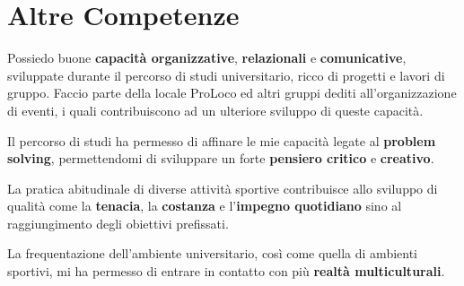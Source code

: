 %
%
%
%
%
%



\section{Altre Competenze}

\cvitem{}
{Possiedo buone \textbf{capacità organizzative}, \textbf{relazionali} e
\textbf{comunicative}, sviluppate durante il percorso di studi universitario,
ricco di progetti e lavori di gruppo. Faccio parte della locale ProLoco ed altri
gruppi dediti all'organizzazione di eventi, i quali contribuiscono ad un
ulteriore sviluppo di queste capacità.}

\cvitem{}
{Il percorso di studi ha permesso di affinare le mie capacità legate al
\textbf{problem solving}, permettendomi di sviluppare un forte \textbf{pensiero
critico} e \textbf{creativo}.}

\cvitem{}
{La pratica abitudinale di diverse attività sportive contribuisce allo sviluppo
di qualità come la \textbf{tenacia}, la \textbf{costanza} e l'\textbf{impegno
quotidiano} sino al raggiungimento degli obiettivi prefissati.}

\cvitem{}
{La frequentazione dell'ambiente universitario, così come quella di ambienti
sportivi, mi ha permesso di entrare in contatto con più \textbf{realtà
multiculturali}.}
